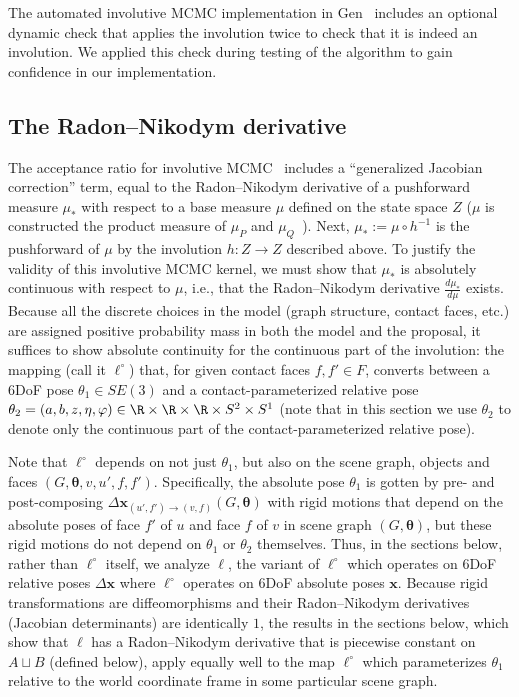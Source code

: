The automated involutive MCMC implementation in Gen~\citep{cusumano2019gen}
includes an optional dynamic check that applies the involution twice to check that it is indeed an involution.
We applied this check during testing of the algorithm to gain confidence in our implementation.

\subsection{The Radon--Nikodym derivative}


The acceptance ratio for involutive MCMC~\citep{cusumano2020automating} includes a ``generalized Jacobian correction'' term, equal to the Radon--Nikodym derivative of a pushforward measure $\mu_*$ with respect to a base measure $\mu$ defined on the state space $Z$
($\mu$ is constructed the product measure of $\mu_P$ and $\mu_Q$~\citep{cusumano2020automating}).
Next, $\mu_* := \mu \circ h^{-1}$ is the pushforward of $\mu$ by the involution $h: Z \to Z$ described above.
To justify the validity of this involutive MCMC kernel, we must show that $\mu_*$ is absolutely continuous with respect to $\mu$, i.e., that the Radon--Nikodym derivative $\frac{d\mu_*}{d\mu}$ exists.
Because all the discrete choices in the model (graph structure, contact faces, etc.) are assigned positive probability mass in both the model and the proposal, it suffices to show absolute continuity for the continuous part of the involution: the mapping (call it $\ell^\circ$) that, for given contact faces $f, f' \in F$, converts between a 6DoF pose $\theta_1 \in SE(3)$ and a contact-parameterized relative pose $\theta_2 = (a, b, z, \eta, \varphi) \in \R \times \R \times \R \times S^2 \times S^1$
(note that in this section we use $\theta_2$ to denote only the continuous part of the contact-parameterized relative pose).

Note that $\ell^\circ$ depends on not just $\theta_1$, but also on the scene graph, objects and faces $(G, \bm\theta, v, u', f, f')$.
Specifically, the absolute pose $\theta_1$ is gotten by pre- and post-composing $\Delta\mathbf{x}_{(u',f') \to (v, f)}(G, \bm\theta)$ with rigid motions that depend on the absolute poses of face $f'$ of $u$ and face $f$ of $v$ in scene graph $(G, \bm\theta)$, but these rigid motions do not depend on $\theta_1$ or $\theta_2$ themselves.
Thus, in the sections below, rather than $\ell^\circ$ itself, we analyze $\ell$, the variant of $\ell^\circ$ which operates on 6DoF relative poses $\Delta\mathbf{x}$ where $\ell^\circ$ operates on 6DoF absolute poses $\mathbf{x}$.
Because rigid transformations are diffeomorphisms and their Radon--Nikodym derivatives (Jacobian determinants) are identically $1$, the results in the sections below, which show that $\ell$ has a Radon--Nikodym derivative that is piecewise constant on $A \sqcup B$ (defined below), apply equally well to the map $\ell^\circ$ which parameterizes $\theta_1$ relative to the world coordinate frame in some particular scene graph.

